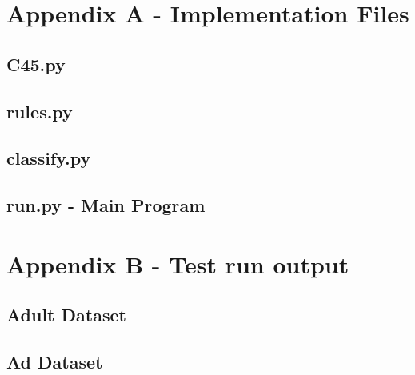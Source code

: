 \documentclass[letterpaper]{article}
\begin{document}
\onecolumn
\newpage
\section{Appendix A - Implementation Files}
\subsection{C45.py}

\subsection{rules.py}

\subsection{classify.py}

\subsection{run.py - Main Program}


\newpage
\section{Appendix B - Test run output}
\subsection{Adult Dataset}

\subsection{Ad Dataset}

\end{document}
